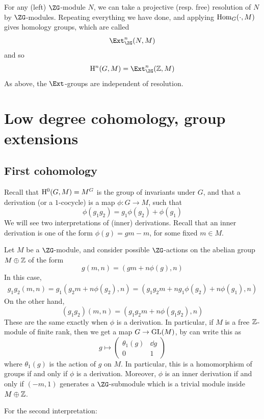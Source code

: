 \documentclass{article}
\begin{document}
\begin{remark}
    For any (left) \(\ZG\)-module \(N\), we can take a projective (resp. free) resolution of \(N\) by \(\ZG\)-modules. Repeating everything we have done, and applying \(\operatorname{Hom}_G(\cdot, M)\) gives homology groups, which are called
    \[\Ext^n_{\ZG}(N, M)\]
    and so
    \[\HH^n(G, M) = \Ext^n_{\ZG}(\Z, M)\]
    As above, the \(\Ext\)-groups are independent of resolution.
\end{remark}

\section{Low degree cohomology, group extensions}

\subsection{First cohomology}

Recall that \(\mathrm{H}^0(G, M) = M^G\) is the group of invariants under \(G\), and that a derivation (or a \(1\)-cocycle) is a map \(\phi : G \to M\), such that
\[\phi(g_1g_2) = g_1\phi(g_2) + \phi(g_1)\]
We will see two interpretations of (inner) derivations. Recall that an inner derivation is one of the form \(\phi(g) = gm - m\), for some fixed \(m \in M\).

Let \(M\) be a \(\ZG\)-module, and consider possible \(\ZG\)-actions on the abelian group \(M \oplus \mathbb{Z}\) of the form
\[g(m, n) = (gm + n\phi(g), n)\]
In this case,
\begin{align*}
    g_1g_2(m, n) = g_1(g_2m + n\phi(g_2), n) = (g_1g_2m + ng_1\phi(g_2) + n\phi(g_1), n)
\end{align*}
On the other hand,
\[(g_1g_2)(m, n) = (g_1g_2 m + n\phi(g_1g_2), n)\]
These are the same exactly when \(\phi\) is a derivation. In particular, if \(M\) is a free \(\mathbb{Z}\)-module of finite rank, then we get a map \(G \to \operatorname{GL}(M)\), by can write this as
\[g \mapsto \begin{pmatrix}
    \theta_1(g) & \dd g \\
    0 & 1
\end{pmatrix}\]
where \(\theta_1(g)\) is the action of \(g\) on \(M\). In particular, this is a homomorphism of groups if and only if \(\phi\) is a derivation. Moreover, \(\phi\) is an inner derivation if and only if \((-m, 1)\) generates a \(\ZG\)-submodule which is a trivial module inside \(M \oplus \mathbb{Z}\).

\lec

For the second interpretation:
\end{document}
